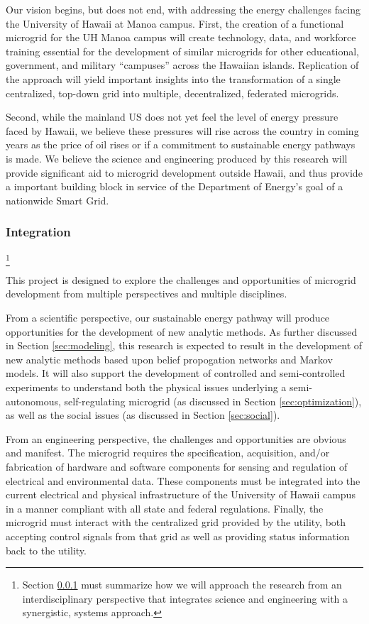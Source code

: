Our vision begins, but does not end, with addressing the energy challenges
facing the University of Hawaii at Manoa campus.  First, the creation of a
functional microgrid for the UH Manoa campus will create technology, data,
and workforce training essential for the development of similar microgrids
for other educational, government, and military ``campuses'' across the
Hawaiian islands.  Replication of the approach will yield important
insights into the transformation of a single centralized, top-down
grid into multiple, decentralized, federated microgrids. 

Second, while the mainland US does not yet feel the level of energy
pressure faced by Hawaii, we believe these pressures will rise across the
country in coming years as the price of oil rises or if a commitment to
sustainable energy pathways is made. We believe the science and engineering
produced by this research will provide significant aid to microgrid
development outside Hawaii, and thus provide a important building block in
service of the Department of Energy's goal of a nationwide Smart Grid.

\subsubsection{Integration}
\label{sec:integration}

\footnote{Section \ref{sec:integration} must summarize how we will approach the research from an
  interdisciplinary perspective that integrates science and engineering
  with a synergistic, systems approach.}

This project is designed to explore the challenges and opportunities of
microgrid development from multiple perspectives and multiple disciplines.   

From a scientific perspective, our sustainable energy pathway will produce
opportunities for the development of new analytic methods.  As further
discussed in Section \ref{sec:modeling}, this research is expected to
result in the development of new analytic methods based upon belief
propogation networks and Markov models.  It will also support the
development of controlled and semi-controlled experiments to understand both
the physical issues underlying a semi-autonomous, self-regulating microgrid
(as discussed in Section \ref{sec:optimization}), as well as the social 
issues (as discussed in Section \ref{sec:social}).

From an engineering perspective, the challenges and opportunities are
obvious and manifest.  The microgrid requires the specification,
acquisition, and/or fabrication of hardware and software components for
sensing and regulation of electrical and environmental data. These
components must be integrated into the current electrical and physical
infrastructure of the University of Hawaii campus in a manner compliant
with all state and federal regulations.  Finally, the microgrid must
interact with the centralized grid provided by the utility, both accepting
control signals from that grid as well as providing status information back
to the utility.

